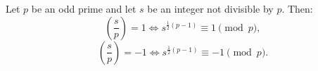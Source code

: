 Let $p$ be an odd prime and let $s$ be an integer not divisible by $p$. Then:
$$\left(\frac{s}{p}\right) = 1 \iff s^{\frac{1}{2}(p-1)} \equiv 1 \pmod{p},$$
$$\left(\frac{s}{p}\right) = -1 \iff s^{\frac{1}{2}(p-1)} \equiv -1 \pmod{p}.$$

